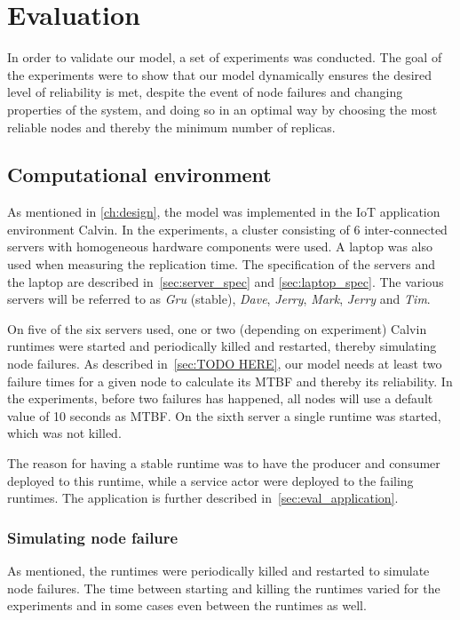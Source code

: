 \documentclass{cslthse-msc}
\begin{document}
\chapter{Evaluation} \label{ch:evaluation}
In order to validate our model, a set of experiments was conducted. The goal of the experiments were to show that our model dynamically ensures the desired level of reliability is met, despite the event of node failures and changing properties of the system, and doing so in an optimal way by choosing the most reliable nodes and thereby the minimum number of replicas.

\section{Computational environment} \label{sec:eval_comp_env}
As mentioned in \cref{ch:design}, the model was implemented in the IoT application environment Calvin. In the experiments, a cluster consisting of 6 inter-connected servers with homogeneous hardware components were used. A laptop was also used when measuring the replication time. The specification of the servers and the laptop are described in~\cref{sec:server_spec} and \cref{sec:laptop_spec}. The various servers will be referred to as \emph{Gru} (stable), \emph{Dave}, \emph{Jerry}, \emph{Mark}, \emph{Jerry} and \emph{Tim}.

On five of the six servers used, one or two (depending on experiment) Calvin runtimes were started and periodically killed and restarted, thereby simulating node failures. As described in~\cref{sec:TODO HERE}, our model needs at least two failure times for a given node to calculate its MTBF and thereby its reliability. In the experiments, before two failures has happened, all nodes will use a default value of 10 seconds as MTBF. On the sixth server a single runtime was started, which was not killed.

The reason for having a stable runtime was to have the producer and consumer deployed to this runtime, while a service actor were deployed to the failing runtimes. The application is further described in~\cref{sec:eval_application}.

\subsection{Simulating node failure} \label{sec:simulating_node_failure}
As mentioned, the runtimes were periodically killed and restarted to simulate node failures. The time between starting and killing the runtimes varied for the experiments and in some cases even between the runtimes as well.
\end{document}
